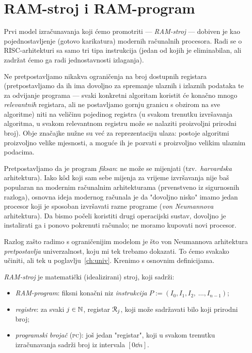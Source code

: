 \section{RAM-stroj i RAM-program}\label{sec:RAMizr}

Prvi model izračunavanja koji ćemo promotriti --- \emph{RAM-stroj} --- dobiven je kao pojednostavljenje (gotovo karikatura) modernih računalnih procesora. Radi se o RISC-arhitekturi sa samo tri tipa instrukcija (jedan od kojih je eliminabilan, ali zadržat ćemo ga radi jednostavnosti izlaganja).

Ne pretpostavljamo nikakva ograničenja na broj dostupnih registara (pretpostavljamo da ih ima dovoljno za spremanje ulaznih i izlaznih podataka te za odvijanje programa --- svaki konkretni algoritam koristit će konačno mnogo \emph{relevantnih} registara, ali ne postavljamo gornju granicu s obzirom na sve algoritme) niti na veličinu pojedinog registra (u svakom trenutku izvršavanja algoritma, u svakom relevantnom registru može se nalaziti proizvoljni prirodni broj). Obje značajke nužne su već za reprezentaciju ulaza: postoje algoritmi proizvoljno velike mjesnosti, a moguće ih je pozvati s proizvoljno velikim ulaznim podacima.

Pretpostavljamo da je program \emph{fiksan}: ne može se mijenjati (tzv.\ \emph{harvardska} arhitektura). Iako k\^od koji sam sebe mijenja za vrijeme izvršavanja nije baš popularan na modernim računalnim arhitekturama (prvenstveno iz sigurnosnih razloga), osnovna ideja modernog računala je da "dovoljno nisko" imamo jedan procesor koji je sposoban izvršavati razne programe (\emph{von Neumannova} arhitektura). Da bismo počeli koristiti drugi operacijski sustav, dovoljno je instalirati ga i ponovo pokrenuti računalo; ne moramo kupovati novi procesor.

Razlog zašto radimo s ograničenijim modelom je što von Neumannova arhitektura \emph{pretpostavlja} univerzalnost, koju mi tek trebamo dokazati. To ćemo svakako učiniti, ali tek u poglavlju~\ref{ch:univ}. Krenimo s osnovnim definicijama.


\begin{definicija}[{name=[RAM-stroj]}]
\emph{RAM-stroj} je matematički (idealizirani) stroj, koji sadrži:
\begin{itemize}
    \item \emph{RAM-program}: fiksni konačni niz \emph{instrukcija} $P:=(I_0,I_1,I_2,~\dotsc, I_{n-1})$;
    \item \emph{registre}: za svaki $j\in{\mathbb N}$, registar $\mathcal R_{j}$, koji može sadržavati bilo koji prirodni broj;
    \item \emph{programski brojač} (\textsc{pc}): još jedan "registar", koji u svakom trenutku iz\-ra\-ču\-na\-va\-nja sadrži broj iz intervala $[0\dd n]$.
    \qedhere
\end{itemize}
\end{definicija}

